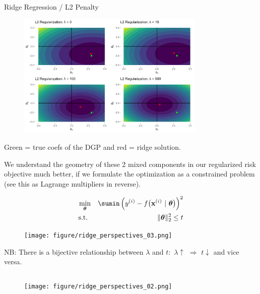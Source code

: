\documentclass[11pt,compress,t,notes=noshow, xcolor=table]{beamer}
\begin{document}
\begin{vbframe}{Ridge Regression / L2 Penalty}
\begin{figure}
\includegraphics[width=0.8\textwidth]{figure/reg_contours_02.png}
\end{figure}
\vspace{-0.2cm}
Green  = true coefs of the DGP and red = ridge solution.

\framebreak

We understand the geometry of these 2 mixed components in our regularized risk objective much better, if we formulate the optimization as a constrained problem (see this as Lagrange multipliers in reverse).

\vspace{-0.5cm}

\begin{eqnarray*}
\min_{\thetav} && \sumin \left(\yi - \fxit\right)^2 \\
  \text{s.t. } && \|\thetav\|_2^2  \leq t \\
\end{eqnarray*}

\vspace{-1.0cm}

\begin{figure}
\texttt{[image: figure/ridge\_perspectives\_03.png]}
\end{figure}

\begin{footnotesize} 
NB: There is a bijective relationship between $\lambda$ and $t$: $\, \lambda \uparrow \,\, \Rightarrow \,\, t \downarrow$ and vice versa.
\end{footnotesize}

\framebreak

\begin{columns}
\begin{column}{0.5\textwidth}
\lz
\begin{figure}
\texttt{[image: figure/ridge\_perspectives\_02.png]}
\end{figure}
\end{column}


\end{columns}
\end{vbframe}
\end{document}
